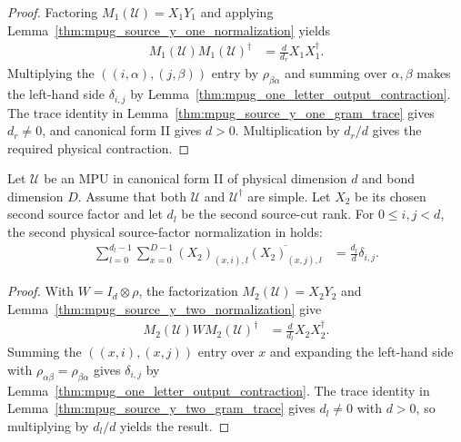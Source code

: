\begin{proof}\leanok
    Factoring $M_1(\mathcal U)=X_1Y_1$ and applying
    Lemma~\ref{thm:mpug_source_y_one_normalization} yields
    \begin{align}
        M_1(\mathcal U)M_1(\mathcal U)^\dagger
         & =\frac{d}{d_r}X_1X_1^\dagger.
    \end{align}
    Multiplying the $((i,\alpha),(j,\beta))$ entry by
    $\rho_{\beta\alpha}$ and summing over $\alpha,\beta$ makes the left-hand
    side $\delta_{i,j}$ by Lemma~\ref{thm:mpug_one_letter_output_contraction}.
    The trace identity in Lemma~\ref{thm:mpug_source_y_one_gram_trace}
    gives $d_r\ne0$, and canonical form II gives $d>0$. Multiplication by
    $d_r/d$ gives the required physical contraction.
\end{proof}

\begin{lemma}
    \label{thm:mpug_source_x_two_physical_normalization}
    \leanok
    Let $\mathcal U$ be an MPU in canonical form II of physical dimension
    $d$ and bond dimension $D$. Assume that both $\mathcal U$ and
    $\mathcal U^\dagger$ are simple. Let $X_2$ be its chosen second source
    factor and let $d_l$ be the second source-cut rank. For $0\leq i,j<d$,
    the second physical source-factor normalization in
    \cite[lines~1120--1162]{FrancoRubio2025MPUGauging} holds:
    \begin{align}
        \sum_{l=0}^{d_l-1}\sum_{x=0}^{D-1}
        (X_2)_{(x,i),l}\overline{(X_2)_{(x,j),l}}
         & =\frac{d_l}{d}\delta_{i,j}.
    \end{align}
\end{lemma}

\begin{proof}\leanok
    With $W=I_d\otimes\rho$, the factorization $M_2(\mathcal U)=X_2Y_2$
    and Lemma~\ref{thm:mpug_source_y_two_normalization} give
    \begin{align}
        M_2(\mathcal U)WM_2(\mathcal U)^\dagger
         & =\frac{d}{d_l}X_2X_2^\dagger.
    \end{align}
    Summing the $((x,i),(x,j))$ entry over $x$ and expanding the left-hand
    side with $\rho_{\alpha\beta}=\rho_{\beta\alpha}$ gives
    $\delta_{i,j}$ by Lemma~\ref{thm:mpug_one_letter_output_contraction}.
    The trace identity in Lemma~\ref{thm:mpug_source_y_two_gram_trace}
    gives $d_l\ne0$ with $d>0$, so multiplying by $d_l/d$ yields the result.
\end{proof}

